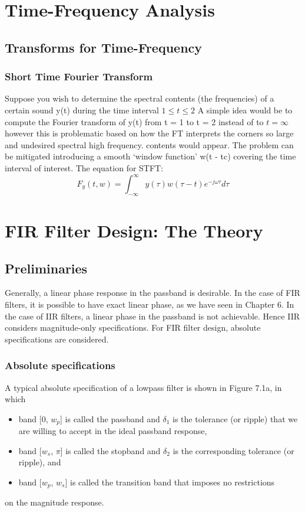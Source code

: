 \documentclass{article}
\begin{document}
\section{Time-Frequency Analysis}
\subsection{Transforms for Time-Frequency}
\subsubsection{Short  Time Fourier Transform}
Suppose you wish to determine the spectral contents (the frequencies) of a certain
sound y(t) during the time interval $1 \leq t \leq 2$ A simple idea would be to compute the Fourier transform of y(t) from t = 1 to t = 2 instead of %
to $t = \infty$ however this is problematic based on how the FT interprets the corners so large and undesired spectral high frequency. contents would appear. The problem can be mitigated introducing a smooth ‘window
function’ w(t - tc) covering the time interval of interest. The equation for STFT: 
\begin{equation}
F_y(t,w) = \int_{-\infty}^{\infty}y(\tau)w(\tau-t)e^{-j\omega \tau}d\tau
\end{equation}

\section{FIR Filter Design: The Theory}
\subsection{Preliminaries}
Generally, a linear phase response in the passband is desirable. In the case of FIR filters, it is possible to have exact linear phase, as we have seen in Chapter 6. In the case of
IIR filters, a linear phase in the passband is not achievable. Hence IIR
considers magnitude-only specifications. For FIR filter design, absolute specifications are considered. 

\subsubsection{Absolute specifications}
A typical absolute specification of a lowpass filter is shown in Figure 7.1a,
in which

\begin{itemize}
    \item band [0, $w_p$] is called the passband and  $\delta_1$ is the tolerance (or ripple) that we are willing to accept in the ideal passband response,
    \item  band [$w_s$, $\pi$] is called the stopband and $\delta_2$ is the corresponding tolerance (or ripple), and \\
    \item band [$w_p$, $w_s$] is called the transition band that imposes no restrictions \\
\end{itemize}
on the magnitude response.
\end{document}
